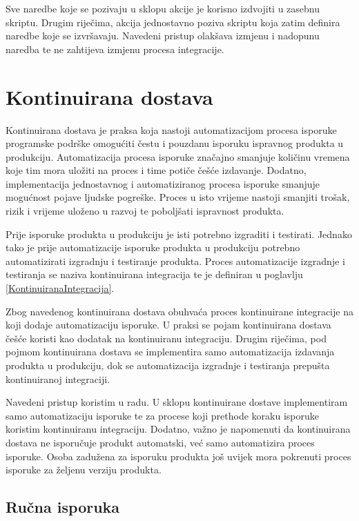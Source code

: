 \documentclass[times, utf8, diplomski, numeric]{fer}
\begin{document}
Sve naredbe koje se pozivaju u sklopu akcije je korisno izdvojiti u zasebnu skriptu. Drugim riječima, akcija jednostavno poziva skriptu koja zatim definira naredbe koje se izvršavaju. Navedeni pristup olakšava izmjenu i nadopunu naredba te ne zahtijeva izmjenu procesa integracije.





\chapter{Kontinuirana dostava}

Kontinuirana dostava je praksa koja nastoji automatizacijom procesa isporuke programske podrške omogućiti čestu i pouzdanu isporuku ispravnog produkta u produkciju. Automatizacija procesa isporuke značajno smanjuje količinu vremena koje tim mora uložiti na proces i time potiče češće izdavanje. Dodatno, implementacija jednostavnog i automatiziranog procesa isporuke smanjuje mogućnost pojave ljudske pogreške. Proces u isto vrijeme nastoji smanjiti trošak, rizik i vrijeme uloženo u razvoj te poboljšati ispravnost produkta\citep{wiki:ContinuousDelivery}.

Prije isporuke produkta u produkciju je isti potrebno izgraditi i testirati. Jednako tako je prije automatizacije isporuke produkta u produkciju potrebno automatizirati izgradnju i testiranje produkta. Proces automatizacije izgradnje i testiranja se naziva kontinuirana integracija te je definiran u poglavlju \ref{KontinuiranaIntegracija}.

Zbog navedenog kontinuirana dostava obuhvaća proces kontinuirane integracije na koji dodaje automatizaciju isporuke. U praksi se pojam kontinuirana dostava češće koristi kao dodatak na kontinuiranu integraciju. Drugim riječima, pod pojmom kontinuirana dostava se implementira samo automatizacija izdavanja produkta u produkciju, dok se automatizacija izgradnje i testiranja prepušta kontinuiranoj integraciji.

Navedeni pristup koristim u radu. U sklopu kontinuirane dostave implementiram samo automatizaciju isporuke te za procese koji prethode koraku isporuke koristim kontinuiranu integraciju. Dodatno, važno je napomenuti da kontinuirana dostava ne isporučuje produkt automatski, već samo automatizira proces isporuke. Osoba zadužena za isporuku produkta još uvijek mora pokrenuti proces isporuke za željenu verziju produkta.


\section{Ručna isporuka} \label{header:RucnaIsporuka}
\end{document}
